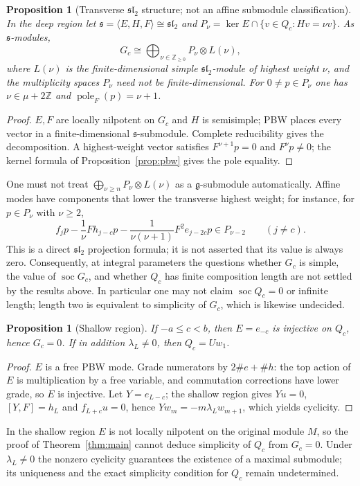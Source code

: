 \documentclass[11pt,a4paper]{article}
\theoremstyle{upright}
\newtheorem{proposition}[theorem]{Proposition}
\newcommand{\Z}{\mathbb Z}
\newcommand{\g}{\mathfrak g}
\newcommand{\s}{\mathfrak s}
\newcommand{\slc}{\mathfrak{sl}_2}
\DeclareMathOperator{\soc}{soc}
\DeclareMathOperator{\pole}{pole}
\begin{document}
\begin{proposition}[Transverse $\slc$ structure; not an affine submodule
classification]\label{prop:sl2}
In the deep region let $\s=\langle E,H,F\rangle\cong\slc$ and
$P_\nu=\ker E\cap\{v\in Q_c:Hv=\nu v\}$. As $\s$-modules,
\[
G_c\cong\bigoplus_{\nu\in\Z_{\ge0}}P_\nu\otimes L(\nu),
\]
where $L(\nu)$ is the finite-dimensional simple $\slc$-module of highest
weight $\nu$, and the multiplicity spaces $P_\nu$ need not be
finite-dimensional. For $0\ne p\in P_\nu$ one has $\nu\in\mu+2\Z$ and
$\pole_F(p)=\nu+1$.
\end{proposition}
\begin{proof}
$E,F$ are locally nilpotent on $G_c$ and $H$ is semisimple; PBW places every
vector in a finite-dimensional $\s$-submodule. Complete reducibility gives
the decomposition. A highest-weight vector satisfies $F^{\nu+1}p=0$ and
$F^\nu p\ne0$; the kernel formula of Proposition~\ref{prop:pbw} gives the
pole equality.
\end{proof}

One must not treat $\bigoplus_{\nu\ge n}P_\nu\otimes L(\nu)$ as a
$\g$-submodule automatically. Affine modes have components that lower the
transverse highest weight; for instance, for $p\in P_\nu$ with $\nu\ge2$,
\[
f_jp-\frac1\nu Fh_{j-c}p
-\frac1{\nu(\nu+1)}F^2e_{j-2c}p\in P_{\nu-2}
\qquad(j\ne c).
\]
This is a direct $\slc$ projection formula; it is not asserted that its
value is always zero. Consequently, at integral parameters the questions
whether $G_c$ is simple, the value of $\soc G_c$, and whether $Q_c$ has
finite composition length are not settled by the results above. In
particular one may not claim $\soc Q_c=0$ or infinite length; length two is
equivalent to simplicity of $G_c$, which is likewise undecided.

\begin{proposition}[Shallow region]\label{prop:shallow}
If $-a\le c<b$, then $E=e_{-c}$ is injective on $Q_c$, hence $G_c=0$. If in
addition $\lambda_L\ne0$, then $Q_c=Uw_1$.
\end{proposition}
\begin{proof}
$E$ is a free PBW mode. Grade numerators by $2\#e+\#h$: the top action of
$E$ is multiplication by a free variable, and commutation corrections have
lower grade, so $E$ is injective. Let $Y=e_{L-c}$; the shallow region gives
$Yu=0$, $[Y,F]=h_L$ and $f_{L+c}u=0$, hence $Yw_m=-m\lambda_Lw_{m+1}$, which
yields cyclicity.
\end{proof}

In the shallow region $E$ is not locally nilpotent on the original module
$M$, so the proof of Theorem~\ref{thm:main} cannot deduce simplicity of
$Q_c$ from $G_c=0$. Under $\lambda_L\ne0$ the nonzero cyclicity guarantees
the existence of a maximal submodule; its uniqueness and the exact
simplicity condition for $Q_c$ remain undetermined.
\end{document}
